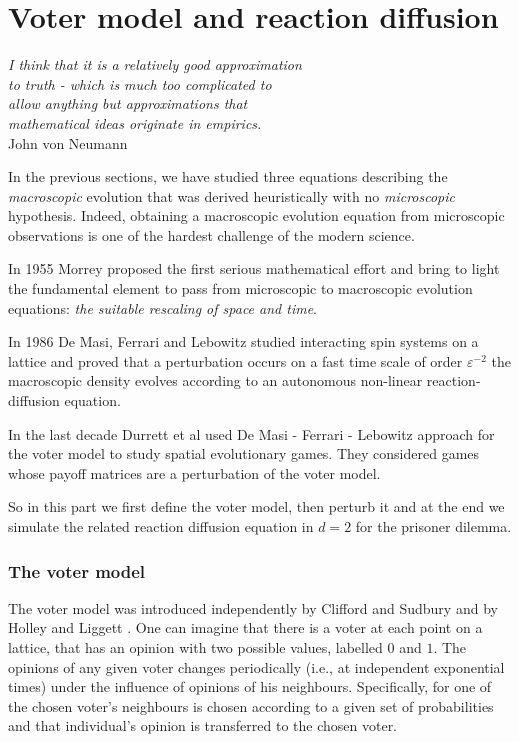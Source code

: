 
\part{Voter model and reaction diffusion }
\noindent \begin{flushright}
\textit{I think that it is a relatively good approximation}\\
\textit{ to truth - which is much too complicated to }\\
\textit{allow anything but approximations \textemdash{} that}\\
\textit{ mathematical ideas originate in empirics.}\\
John von Neumann
\par\end{flushright}

In the previous sections, we have studied three equations describing
the \textit{macroscopic} evolution that was derived heuristically
with no \textit{microscopic} hypothesis. Indeed, obtaining a macroscopic
evolution equation from microscopic observations is one of the hardest
challenge of the modern science.

In 1955 Morrey \cite{Morrey1955} proposed the first serious mathematical
effort and bring to light the fundamental element to pass from microscopic
to macroscopic evolution equations: \textit{the suitable rescaling
of space and time}. 

In 1986 De Masi, Ferrari and Lebowitz \cite{DeMasi1987} studied interacting
spin systems on a lattice and proved that a perturbation occurs on
a fast time scale of order $\varepsilon^{-2}$ the macroscopic density
evolves according to an autonomous non-linear reaction-diffusion equation.

In the last decade Durrett et al \cite{cox_voter_2011,durrett_spatial_2014}
used De Masi - Ferrari - Lebowitz approach for the voter model to
study spatial evolutionary games. They considered games whose payoff
matrices are a perturbation of the voter model.

So in this part we first define the voter model, then perturb it and
at the end we simulate the related reaction diffusion equation in
$d=2$ for the prisoner dilemma. 

\section{The voter model\label{sec:The-voter-model}}

The voter model was introduced independently by Clifford and Sudbury
\cite{CLIFFORD1973} and by Holley and Liggett \cite{LiggettH1975}.
One can imagine that there is a \textquotedbl{}voter\textquotedbl{}
at each point on a lattice, that has an opinion with two possible
values, labelled $0$ and $1$. The opinions of any given voter changes
periodically (i.e., at independent exponential times) under the influence
of opinions of his neighbours. Specifically, for one of the chosen
voter's neighbours is chosen according to a given set of probabilities
and that individual's opinion is transferred to the chosen voter.

